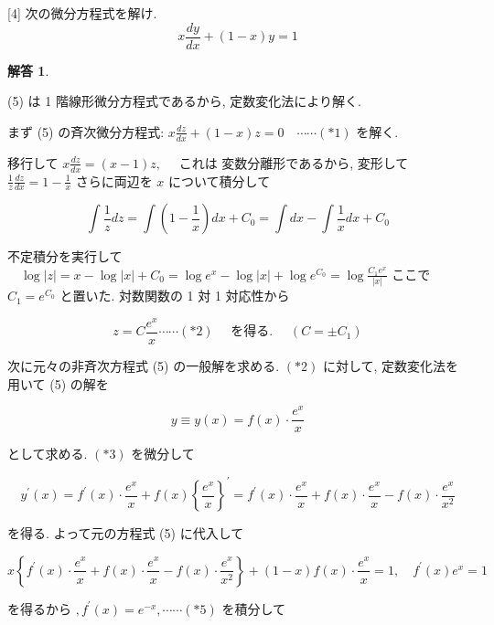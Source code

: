 \documentclass[10pt]{jsarticle}
\newtheorem*{answer*}{解答}
\begin{document}
\begin{itembox}[l]{[4] 次の微分方程式を解け.}
\begin{equation*}
x \frac{d y}{d x}+(1-x) y=1 \tag{5}
\end{equation*}
\end{itembox}

\bigskip

\begin{answer*}
\end{answer*}

(5) は 1 階線形微分方程式であるから, 定数変化法により解く.

まず (5) の斉次微分方程式: $x \frac{d z}{d x}+(1-x) z=0 \quad \cdots \cdots(* 1)$ を解く.

移行して $x \frac{d z}{d x}=(x-1) z, \quad$ これは 変数分離形であるから, 変形して $\frac{1}{z} \frac{d z}{d x}=1-\frac{1}{x}$ さらに両辺を $x$ について積分して

$$
\int \frac{1}{z} d z=\int\left(1-\frac{1}{x}\right) d x+C_{0}=\int d x-\int \frac{1}{x} d x+C_{0}
$$

不定積分を実行して $\quad \log |z|=x-\log |x|+C_{0}=\log e^{x}-\log |x|+\log e^{C_{0}}=\log \frac{C_{1} e^{x}}{|x|}$ ここで $C_{1}=e^{C_{0}}$ と置いた. 対数関数の 1 対 1 対応性から

$$
z=C \frac{e^{x}}{x} \cdots \cdots(* 2) \quad \text { を得る. } \quad\left(C= \pm C_{1}\right)
$$

次に元々の非斉次方程式 (5) の一般解を求める. $(* 2)$ に対して, 定数変化法を 用いて (5) の解を


\begin{equation*}
y \equiv y(x)=f(x) \cdot \frac{e^{x}}{x} \tag{*3}
\end{equation*}


として求める. $(* 3)$ を微分して


\begin{equation*}
y^{\prime}(x)=f^{\prime}(x) \cdot \frac{e^{x}}{x}+f(x)\left\{\frac{e^{x}}{x}\right\}^{\prime}=f^{\prime}(x) \cdot \frac{e^{x}}{x}+f(x) \cdot \frac{e^{x}}{x}-f(x) \cdot \frac{e^{x}}{x^{2}} \tag{*4}
\end{equation*}


を得る. よって元の方程式 (5) に代入して

$$
x\left\{f^{\prime}(x) \cdot \frac{e^{x}}{x}+f(x) \cdot \frac{e^{x}}{x}-f(x) \cdot \frac{e^{x}}{x^{2}}\right\}+(1-x) f(x) \cdot \frac{e^{x}}{x}=1, \quad f^{\prime}(x) e^{x}=1
$$

を得るから $, f^{\prime}(x)=e^{-x}, \cdots \cdots(* 5)$ を積分して
\end{document}
